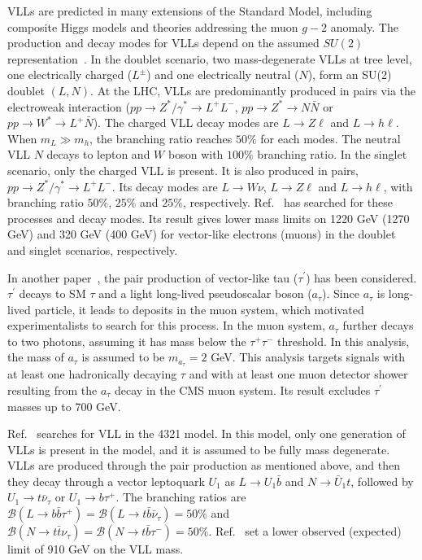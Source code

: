 \documentclass[a4paper,11pt]{article}
\begin{document}
VLLs are predicted in many extensions of the Standard Model, including composite Higgs models and theories addressing the muon $g-2$ anomaly.
The production and decay modes for VLLs depend on the assumed $SU(2)$
representation~\cite{Kumar:2015tna,Bhattiprolu:2019vdu}. 
In the doublet scenario, two mass-degenerate VLLs at tree level, one electrically charged ($L^\pm$) and one electrically neutral ($N$), form an SU(2) doublet $(L, N)$.
At the LHC, VLLs are predominantly produced in pairs via the electroweak interaction 
($pp\to Z^*/\gamma^*\to L^+L^-$, $pp\to Z^*\to N\bar{N}$ or $pp\to W^*\to L^+\bar{N}$).
The charged VLL decay modes are $L\to Z\ell$ and $L\to h\ell$. 
When $m_L\gg m_h$, the branching ratio reaches $50\%$ for each modes.
The neutral VLL $N$ decays to lepton and $W$ boson with $100\%$ branching ratio.
In the singlet scenario, only the charged VLL is present. 
It is also produced in pairs, $pp\to Z^*/\gamma^*\to L^+L^-$. 
Its decay modes are $L\to W\nu$, $L\to Z\ell$ and $L\to h\ell$, 
with branching ratio $50\%$, $25\%$ and $25\%$, respectively. 
Ref.~\cite{ATLAS:2024mrr} has searched for these processes and decay modes. 
Its result gives lower mass limits on 1220 GeV (1270 GeV) and 320 GeV (400 GeV) for vector-like electrons (muons) in the
doublet and singlet scenarios, respectively.

In another paper~\cite{CMS:2025urb}, the pair production of vector-like tau ($\tau^\prime$) has been considered. 
$\tau^\prime$ decays to SM $\tau$ and a light long-lived pseudoscalar boson ($a_\tau$). 
Since $a_\tau$ is long-lived particle, it leads to deposits in the muon system, 
which motivated experimentalists to search for this process.
In the muon system, $a_\tau$ further decays to two photons, assuming it has mass below the $\tau^+\tau^-$ threshold. 
In this analysis, the mass of $a_\tau$ is assumed to be $m_{a_{\tau}}=2$ GeV.
This analysis targets signals with at least one hadronically decaying $\tau$ and with at least one muon detector shower resulting from the $a_\tau$ decay in the CMS muon system. 
Its result excludes $\tau^\prime$ masses up to 700 GeV. 

Ref.~\cite{ATLAS:2025wgc} searches for VLL in the 4321 model.
In this model, only one generation of VLLs is present in the model, and it is assumed to be fully mass degenerate. 
VLLs are produced through the pair production as mentioned above, 
and then they decay through a vector leptoquark $U_1$ as $L\to U_1\bar{b}$ and $N\to \bar{U}_1t$, 
followed by $U_1\to t\bar{\nu}_\tau$ or $U_1\to b\tau^+$. 
The branching ratios are $\mathcal{B}(L\to b\bar{b}\tau^+)=\mathcal{B}(L\to t\bar{b}\bar{\nu}_\tau)=50\%$ 
and $\mathcal{B}(N\to t\bar{t}\nu_\tau)=\mathcal{B}(N\to t\bar{b}\tau^-)=50\%$.
Ref.~\cite{ATLAS:2025wgc} set a lower observed (expected) limit of 910
GeV on the VLL mass.
\end{document}

